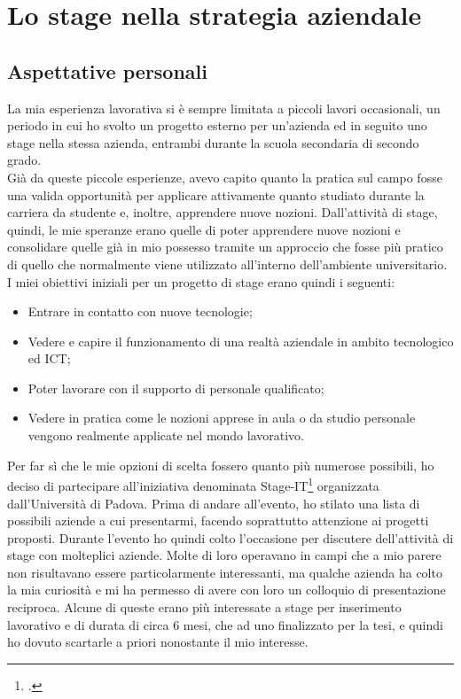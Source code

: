 
\chapter{Lo stage nella strategia aziendale}
\label{cap:lo stage nella strategia aziendale}

\section{Aspettative personali}
La mia esperienza lavorativa si è sempre limitata a piccoli lavori occasionali, un periodo in cui ho svolto un progetto esterno per un'azienda ed in seguito uno stage nella stessa azienda, entrambi durante la scuola secondaria di secondo grado.\\
Già da queste piccole esperienze, avevo capito quanto la pratica sul campo fosse una valida opportunità per applicare attivamente quanto studiato durante la carriera da studente e, inoltre, apprendere nuove nozioni. 
Dall'attività di stage, quindi, le mie speranze erano quelle di poter apprendere nuove nozioni e consolidare quelle già in mio possesso tramite un approccio che fosse più pratico di quello che normalmente viene utilizzato all'interno dell'ambiente universitario. \\
I miei obiettivi iniziali per un progetto di stage erano quindi i seguenti:
\begin{itemize}
	\item Entrare in contatto con nuove tecnologie;
	\item Vedere e capire il funzionamento di una realtà aziendale in ambito tecnologico ed ICT;
	\item Poter lavorare con il supporto di personale qualificato;
	\item Vedere in pratica come le nozioni apprese in aula o da studio personale vengono realmente applicate nel mondo lavorativo.
\end{itemize}
Per far sì che le mie opzioni di scelta fossero quanto più numerose possibili, ho deciso di partecipare all'iniziativa denominata Stage-IT\footcite{http://informatica.math.unipd.it/laurea/stageit.html} organizzata dall'Università di Padova. Prima di andare all'evento, ho stilato una lista di possibili aziende a cui presentarmi, facendo soprattutto attenzione ai progetti proposti. Durante l'evento ho quindi colto l'occasione per discutere dell'attività di stage con molteplici aziende. Molte di loro operavano in campi che a mio parere non risultavano essere particolarmente interessanti, ma qualche azienda ha colto la mia curiosità e mi ha permesso di avere con loro un colloquio di presentazione reciproca. Alcune di queste erano più interessate a stage per inserimento lavorativo e di durata di circa 6 mesi, che ad uno finalizzato per la tesi, e quindi ho dovuto scartarle a priori nonostante il mio interesse. \\
